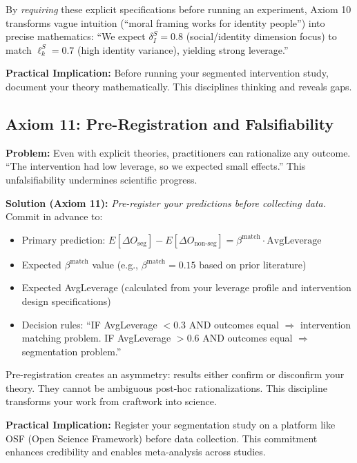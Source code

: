 By \emph{requiring} these explicit specifications before running an experiment, Axiom 10 transforms vague intuition (``moral framing works for identity people'') into precise mathematics: ``We expect $\delta_I^S = 0.8$ (social/identity dimension focus) to match $\ell_k^S = 0.7$ (high identity variance), yielding strong leverage.''

\textbf{Practical Implication:} Before running your segmented intervention study, document your theory mathematically. This disciplines thinking and reveals gaps. \cite{popper1959logic, angrist2010mostly}

\subsection{Axiom 11: Pre-Registration and Falsifiability}

\textbf{Problem:} Even with explicit theories, practitioners can rationalize any outcome. ``The intervention had low leverage, so we expected small effects.'' This unfalsifiability undermines scientific progress.

\textbf{Solution (Axiom 11):} \emph{Pre-register your predictions before collecting data.} Commit in advance to:

\begin{itemize}[nosep]
\item Primary prediction: $E[\Delta O_{\text{seg}}] - E[\Delta O_{\text{non-seg}}] = \beta^{\text{match}} \cdot \text{AvgLeverage}$
\item Expected $\beta^{\text{match}}$ value (e.g., $\beta^{\text{match}} = 0.15$ based on prior literature)
\item Expected AvgLeverage (calculated from your leverage profile and intervention design specifications)
\item Decision rules: ``IF AvgLeverage $< 0.3$ AND outcomes equal $\Rightarrow$ intervention matching problem. IF AvgLeverage $> 0.6$ AND outcomes equal $\Rightarrow$ segmentation problem.''
\end{itemize}

Pre-registration creates an asymmetry: results either confirm or disconfirm your theory. They cannot be ambiguous post-hoc rationalizations. This discipline transforms your work from craftwork into science. \cite{nosek2018registered, collaboration2015estimating}

\textbf{Practical Implication:} Register your segmentation study on a platform like OSF (Open Science Framework) before data collection. This commitment enhances credibility and enables meta-analysis across studies.

